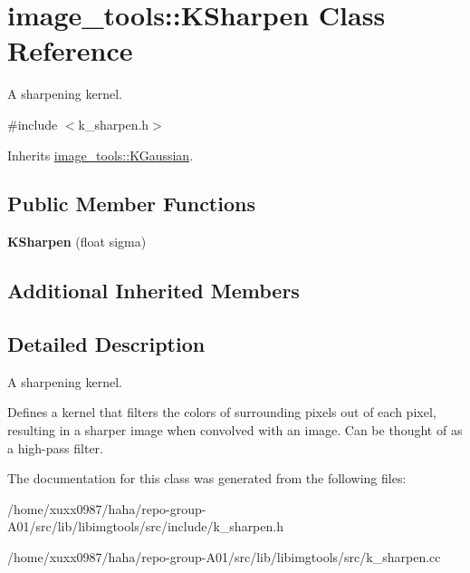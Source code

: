 \hypertarget{classimage__tools_1_1KSharpen}{}\section{image\+\_\+tools\+:\+:K\+Sharpen Class Reference}
\label{classimage__tools_1_1KSharpen}


A sharpening kernel.  




{\ttfamily \#include $<$k\+\_\+sharpen.\+h$>$}



Inherits \hyperlink{classimage__tools_1_1KGaussian}{image\+\_\+tools\+::\+K\+Gaussian}.

\subsection*{Public Member Functions}
\begin{DoxyCompactItemize}
\item 
{\bfseries K\+Sharpen} (float sigma)\hypertarget{classimage__tools_1_1KSharpen_a5b50c63c031ccab6508297b4601c9f56}{}\label{classimage__tools_1_1KSharpen_a5b50c63c031ccab6508297b4601c9f56}

\end{DoxyCompactItemize}
\subsection*{Additional Inherited Members}


\subsection{Detailed Description}
A sharpening kernel. 

Defines a kernel that filters the colors of surrounding pixels out of each pixel, resulting in a sharper image when convolved with an image. Can be thought of as a high-\/pass filter. 

The documentation for this class was generated from the following files\+:\begin{DoxyCompactItemize}
\item 
/home/xuxx0987/haha/repo-\/group-\/\+A01/src/lib/libimgtools/src/include/k\+\_\+sharpen.\+h\item 
/home/xuxx0987/haha/repo-\/group-\/\+A01/src/lib/libimgtools/src/k\+\_\+sharpen.\+cc\end{DoxyCompactItemize}
